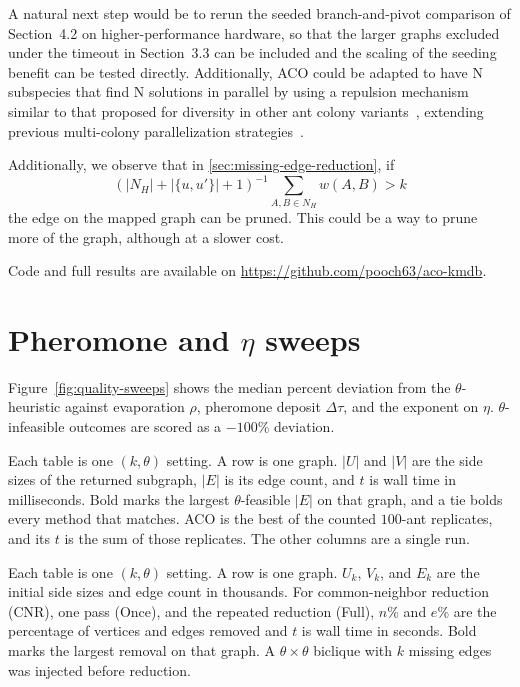 \documentclass[conference]{IEEEtran}
\begin{document}
A natural next step would be to rerun the seeded branch-and-pivot comparison of Section~4.2 on higher-performance hardware, so that the larger graphs excluded under the timeout in Section~3.3 can be included and the scaling of the seeding benefit can be tested directly. Additionally, ACO could be adapted to have N subspecies that find N solutions in parallel by using a repulsion mechanism similar to that proposed for diversity in other ant colony variants~\cite{tfaili2008}, extending previous multi-colony parallelization strategies~\cite{middendorf2002}.

Additionally, we observe that in \ref{sec:missing-edge-reduction}, if
\[
(|N_H| + |\{u, u'\}| + 1)^{-1}\sum_{A, B \in N_H}w(A, B) > k
\]
the edge on the mapped graph can be pruned. This could be a way to prune more of the graph, although at a slower cost.

Code and full results are available on \url{https://github.com/pooch63/aco-kmdb}.

\appendix
\section{Pheromone and $\eta$ sweeps}
\label{app:sweeps}

Figure~\ref{fig:quality-sweeps} shows the median percent deviation from the $\theta$-heuristic against evaporation $\rho$, pheromone deposit $\Delta\tau$, and the exponent on $\eta$. $\theta$-infeasible outcomes are scored as a $-100\%$ deviation.





Each table is one $(k, \theta)$ setting. A row is one graph. $|U|$ and $|V|$ are the side sizes of the returned subgraph, $|E|$ is its edge count, and $t$ is wall time in milliseconds. Bold marks the largest $\theta$-feasible $|E|$ on that graph, and a tie bolds every method that matches. ACO is the best of the counted $100$-ant replicates, and its $t$ is the sum of those replicates. The other columns are a single run.


Each table is one $(k, \theta)$ setting. A row is one graph. $U_k$, $V_k$, and $E_k$ are the initial side sizes and edge count in thousands. For common-neighbor reduction (CNR), one pass (Once), and the repeated reduction (Full), $n\%$ and $e\%$ are the percentage of vertices and edges removed and $t$ is wall time in seconds. Bold marks the largest removal on that graph. A $\theta \times \theta$ biclique with $k$ missing edges was injected before reduction.

\end{document}
